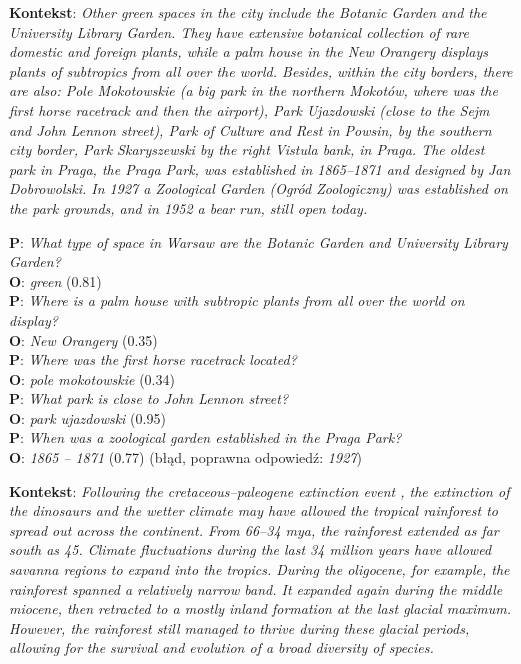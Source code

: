 
\setlength{\abovedisplayskip}{20pt}
\setlength{\belowdisplayskip}{20pt}

\small
\noindent
\textbf{Kontekst}:
\textit{Other green spaces in the city include the Botanic Garden and the University Library Garden. They have extensive botanical collection of rare domestic and foreign plants, while a palm house in the New Orangery displays plants of subtropics from all over the world. Besides, within the city borders, there are also: Pole Mokotowskie (a big park in the northern Mokotów, where was the first horse racetrack and then the airport), Park Ujazdowski (close to the Sejm and John Lennon street), Park of Culture and Rest in Powsin, by the southern city border, Park Skaryszewski by the right Vistula bank, in Praga. The oldest park in Praga, the Praga Park, was established in 1865–1871 and designed by Jan Dobrowolski. In 1927 a Zoological Garden (Ogród Zoologiczny) was established on the park grounds, and in 1952 a bear run, still open today.}

\noindent
\textbf{P}: \textit{What type of space in Warsaw are the Botanic Garden and University Library Garden?}\\
\textbf{O}: \textit{green} (0.81)\\[4pt]
\textbf{P}: \textit{Where is a palm house with subtropic plants from all over the world on display?}\\
\textbf{O}: \textit{New Orangery} (0.35)\\[4pt]
\textbf{P}: \textit{Where was the first horse racetrack located?}\\
\textbf{O}: \textit{pole mokotowskie} (0.34)\\[4pt]
\textbf{P}: \textit{What park is close to John Lennon street?}\\
\textbf{O}: \textit{park ujazdowski} (0.95)\\[4pt]
\textbf{P}: \textit{When was a zoological garden established in the Praga Park?}\\
\textbf{O}: \textit{1865 – 1871} (0.77) (błąd, poprawna odpowiedź: \textit{1927})

\vspace{.3cm}

\noindent
\textbf{Kontekst}:
\textit{Following the cretaceous–paleogene extinction event , the extinction of the dinosaurs and the wetter climate may have allowed the tropical rainforest to spread out across the continent. From 66–34 mya, the rainforest extended as far south as 45\degree. Climate fluctuations during the last 34 million years have allowed savanna regions to expand into the tropics. During the oligocene, for example, the rainforest spanned a relatively narrow band. It expanded again during the middle miocene, then retracted to a mostly inland formation at the last glacial maximum. However, the rainforest still managed to thrive during these glacial periods, allowing for the survival and evolution of a broad diversity of species.}

